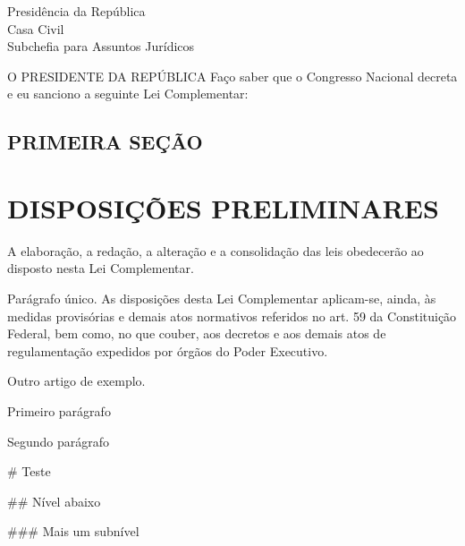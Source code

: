 \documentclass[a4paper,capitulo,12pt]{br-lex}
\begin{document}
\begin{center}
    Presidência da República\\
    Casa Civil\\
    Subchefia para Assuntos Jurídicos   
\end{center}



O PRESIDENTE DA REPÚBLICA Faço saber que o Congresso  Nacional decreta
e eu sanciono a seguinte Lei Complementar:

\section{PRIMEIRA SEÇÃO}

\chapter{DISPOSIÇÕES PRELIMINARES}
\label{chap:disposicoes}

\artigo A elaboração, a redação, a alteração e a consolidação das leis
obedecerão ao disposto nesta Lei Complementar.

Parágrafo único. As disposições desta Lei Complementar aplicam-se, ainda, às medidas provisórias e demais atos normativos referidos no art. 59 da Constituição Federal, bem como, no que couber, aos decretos e aos demais atos de regulamentação expedidos por órgãos do Poder Executivo.

\artigo {}

\artigo Outro artigo de exemplo.

\begin{paragrafos}

\paragrafo Primeiro parágrafo

\paragrafo Segundo parágrafo

\end{paragrafos}

\begin{easylist}

# Teste

## Nível abaixo

### Mais um subnível

\end{easylist}
\end{document}
